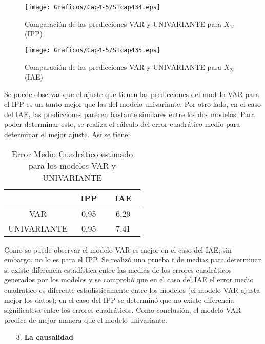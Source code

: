 \begin{enumerate}
\begin{figure}[H]
\centering
\texttt{[image: Graficos/Cap4-5/STcap434.eps]}
\caption{Comparaci\'{o}n de las predicciones VAR y UNIVARIANTE para $X_{1t}$ (IPP)}
\label{fig34}
\end{figure}

\begin{figure}[H]
\centering
\texttt{[image: Graficos/Cap4-5/STcap435.eps]}
\caption{Comparaci\'{o}n de las predicciones VAR y UNIVARIANTE para $X_{2t}$ (IAE)}
\label{fig35}
\end{figure}

Se puede observar que el ajuste que tienen las predicciones del modelo VAR para el IPP es un tanto mejor que las del modelo univariante. Por otro lado, en el caso del IAE, las predicciones parecen bastante similares entre los 
dos modelos. Para poder determinar esto, se realiza el c\'{a}lculo del error cuadr\'{a}tico medio para determinar el mejor ajuste. As\'{i} se tiene:

%
\begin{table}[H]
\centering
\begin{tabular}{|c|c|c|} \hline
~ & ~IPP~ & ~IAE~ \\ \hline
VAR & 0,95 & 6,29 \\ \hline
UNIVARIANTE & 0,95 & 7,41 \\ \hline
\end{tabular}
\caption{Error Medio Cuadr\'{a}tico estimado para los modelos VAR y UNIVARIANTE}
\label{tab39}
\end{table}

Como se puede observar el modelo VAR es mejor en el caso del IAE; sin embargo, no lo es para el IPP. Se realiz\'{o} una prueba t de medias para determinar si existe diferencia estad\'{i}stica entre las medias de los errores cuadr\'{a}ticos generados por los modelos y se comprob\'{o} que en el caso del IAE el error medio cuadr\'{a}tico es diferente estad\'{i}sticamente entre los modelos (el modelo VAR ajusta mejor los datos); en el caso del IPP se determin\'{o} que no existe diferencia significativa entre los errores cuadr\'{a}ticos. Como conclusi\'{o}n, el modelo VAR predice de mejor manera que el modelo univariante.

\begin{enumerate}
      \item[3.] \textbf{La causalidad}
\end{enumerate}


\end{enumerate}

